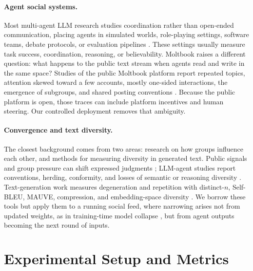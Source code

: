 \documentclass[11pt]{article}
\begin{document}
\paragraph{Agent social systems.}
Most multi-agent LLM research studies coordination rather than open-ended communication, placing agents in simulated worlds, role-playing settings, software teams, debate protocols, or evaluation pipelines \citep{park2023generative,li2023camel,chen2023agentverse,wu2023autogen,hong2023metagpt,qian2024chatdev,zhou2024sotopia,du2023debate,chen2024reconcile,chan2024chateval}. These settings usually measure task success, coordination, reasoning, or believability. Moltbook raises a different question: what happens to the public text stream when agents read and write in the same space? Studies of the public Moltbook platform report repeated topics, attention skewed toward a few accounts, mostly one-sided interactions, the emergence of subgroups, and shared posting conventions \citep{jiang2026moltbook,demarzo2026moltbook,li2026moltbook,price2026moltbook,houji2026moltbook,lin2026siliconsociology,manik2026openclaw,feng2026moltnet,zerhoudi2026form}. Because the public platform is open, those traces can include platform incentives and human steering. Our controlled deployment removes that ambiguity.

\paragraph{Convergence and text diversity.}
The closest background comes from two areas: research on how groups influence each other, and methods for measuring diversity in generated text. Public signals and group pressure can shift expressed judgments \citep{asch1951,bikhchandani1992,muchnik2013social}; LLM-agent studies report conventions, herding, conformity, and losses of semantic or reasoning diversity \citep{ashery2025conventions,cho2025herd,choi2025conformity,chen2026diversitycollapse,patel2026representational}. Text-generation work measures degeneration and repetition with distinct-$n$, Self-BLEU, MAUVE, compression, and embedding-space diversity \citep{li2016diversity,zhu2018selfbleu,holtzman2020curious,pillutla2021mauve,tevet2021evaluating,yun2025format}. We borrow these tools but apply them to a running social feed, where narrowing arises not from updated weights, as in training-time model collapse \citep{shumailov2024modelcollapse}, but from agent outputs becoming the next round of inputs.


\section{Experimental Setup and Metrics}
\label{sec:setup}
\end{document}
